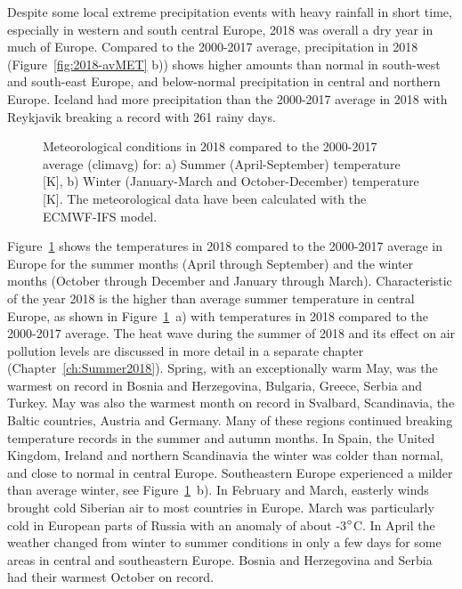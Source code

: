 Despite some local extreme precipitation events with heavy rainfall in short time, especially in western and south central Europe, 2018 was overall a dry year in much of Europe. Compared to the 2000-2017 average, precipitation in 2018  (Figure~\ref{fig:2018-avMET} b)) shows higher amounts than normal in south-west and south-east Europe, and below-normal precipitation in central and northern Europe. Iceland had more precipitation than the 2000-2017 average in 2018 with Reykjavik breaking a record with 261 rainy days.

\begin{figure}[h]
  \centering 
  \caption{Meteorological conditions in 2018 compared to the 2000-2017 average (climavg) for: a) Summer (April-September) temperature [K], b) Winter (January-March and October-December) temperature [K]. The meteorological data have been calculated with the ECMWF-IFS model.} 
\label{fig:temp2018-avMET}
\end{figure}

Figure~\ref{fig:temp2018-avMET} shows the temperatures in 2018 compared to the 2000-2017 average in Europe for the summer months (April through September) and the winter months (October through December and January through March). 
Characteristic of the year 2018 is the higher than average summer temperature in central Europe, as shown in Figure~\ref{fig:temp2018-avMET}~a) with temperatures in 2018 compared to the 2000-2017 average. The heat wave during the summer of 2018 and its effect on air pollution levels are discussed in more detail in a separate chapter (Chapter~\ref{ch:Summer2018}). Spring, with an exceptionally warm May, was the warmest on record in Bosnia and Herzegovina, Bulgaria, Greece, Serbia and Turkey. May was also the warmest month on record in Svalbard, Scandinavia, the Baltic countries, Austria and Germany. Many of these regions continued breaking temperature records in the summer and autumn months.
In Spain, the United Kingdom, Ireland and northern Scandinavia the winter was colder than normal, and close to normal in central Europe. Southeastern Europe experienced a milder than average winter, see Figure~\ref{fig:temp2018-avMET}~b). In February and March, easterly winds brought cold Siberian air to most countries in Europe. March was particularly cold in European parts of Russia with an anomaly of about -3$^\circ$C. In April the weather changed from winter to summer conditions in only a few days for some areas in central and southeastern Europe. 
Bosnia and Herzegovina and Serbia had their warmest October on record.

